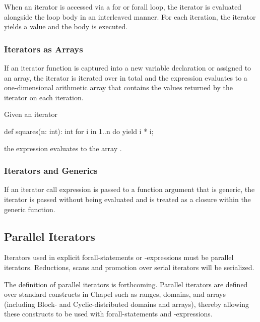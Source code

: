 When an iterator is accessed via a for or forall loop, the iterator is
evaluated alongside the loop body in an interleaved manner.  For each
iteration, the iterator yields a value and the body is executed.

\subsubsection{Iterators as Arrays}
\label{Iterators_as_Arrays}

If an iterator function is captured into a new variable declaration or
assigned to an array, the iterator is iterated over in total and the
expression evaluates to a one-dimensional arithmetic array that
contains the values returned by the iterator on each iteration.
\begin{example}
Given an iterator
\begin{chapel}
def squares(n: int): int {
  for i in 1..n do
    yield i * i;
}
\end{chapel}
the expression  evaluates to the array .
\end{example}

\subsubsection{Iterators and Generics}
\label{Iterators_and_Generics}

If an iterator call expression is passed to a function argument that
is generic, the iterator is passed without being evaluated and is
treated as a closure within the generic function.

\subsection{Parallel Iterators}
\label{Parallel_Iterators}

Iterators used in explicit forall-statements or -expressions must be
parallel iterators.  Reductions, scans and promotion over serial
iterators will be serialized.

The definition of parallel iterators is forthcoming.  Parallel
iterators are defined over standard constructs in Chapel such as
ranges, domains, and arrays (including Block- and Cyclic-distributed
domains and arrays), thereby allowing these constructs to be used with
forall-statements and -expressions.
